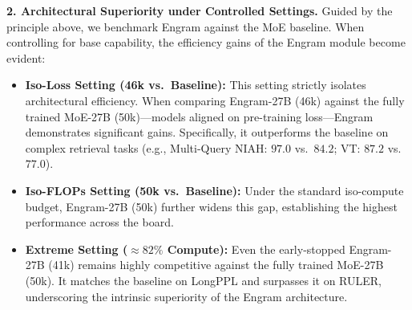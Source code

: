 \textbf{2. Architectural Superiority under Controlled Settings.} 
Guided by the principle above, we benchmark Engram against the MoE baseline. When controlling for base capability, the efficiency gains of the Engram module become evident:
\begin{itemize}
    \item \textbf{Iso-Loss Setting (46k vs.\ Baseline):} This setting strictly isolates architectural efficiency. When comparing Engram-27B (46k) against the fully trained MoE-27B (50k)—models aligned on pre-training loss—Engram demonstrates significant gains. Specifically, it outperforms the baseline on complex retrieval tasks (e.g., Multi-Query NIAH: $97.0$ vs.\ $84.2$; VT: $87.2$ vs.\ $77.0$). 
    \item \textbf{Iso-FLOPs Setting (50k vs.\ Baseline):} Under the standard iso-compute budget, Engram-27B (50k) further widens this gap, establishing the highest performance across the board.
    \item \textbf{Extreme Setting ($\approx82\%$ Compute):} Even the early-stopped Engram-27B (41k) remains highly competitive against the fully trained MoE-27B (50k). It matches the baseline on LongPPL and surpasses it on RULER, underscoring the intrinsic superiority of the Engram architecture.
\end{itemize}